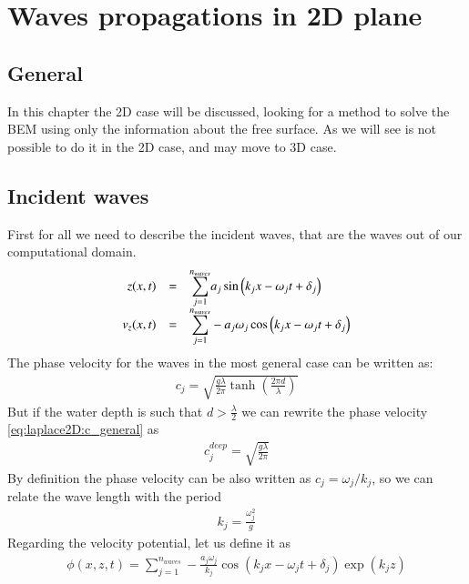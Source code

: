 \chapter{Waves propagations in 2D plane}
\label{s:laplace2D}
%
\section{General}
%
In this chapter the 2D case will be discussed, looking for
a method to solve the BEM using only the information about
the free surface. As we will see is not possible to do it in
the 2D case, and may move to 3D case.
%
\section{Incident waves}
%
First for all we need to describe the incident waves, that are
the waves out of our computational domain.
%
\begin{eqnarray}
	\label{eq:laplace2D:incident_waves}
	\begin{array}{rcl}
	z(x,t) & = & \dsty{\sum_{j=1}^{n_{waves}}} a_j \sin\left(k_j x - \omega_j t + \delta_j \right)
	\\
	v_z(x,t) & = & \dsty{\sum_{j=1}^{n_{waves}}} - a_j \omega_j \cos\left(k_j x - \omega_j t + \delta_j \right)
	\end{array}
\end{eqnarray}
%
The phase velocity for the waves in the most general case can
be written as:
%
\begin{eqnarray}
	\label{eq:laplace2D:c_general}
	c_j = \sqrt{\frac{g \lambda}{2 \pi} \tanh\left(\frac{2 \pi d}{\lambda}\right)}
\end{eqnarray}
%
But if the water depth is such that $d > \frac{\lambda}{2}$ we
can rewrite the phase velocity \ref{eq:laplace2D:c_general} as
%
\begin{eqnarray}
	\label{eq:laplace2D:c_deep}
	c_j^{deep} = \sqrt{\frac{g \lambda}{2 \pi}}
\end{eqnarray}
%
By definition the phase velocity can be also written as
$c_j = \omega_j / k_j$, so we can relate the wave length
with the period
%
\begin{eqnarray}
	\label{eq:laplace2D:k_w}
	k_j = \frac{\omega_j^2}{g}
\end{eqnarray}
%
Regarding the velocity potential, let us define it as
%
\begin{eqnarray}
	\label{eq:laplace2D:incident_waves_potential}
	\phi(x,z,t) = \sum_{j=1}^{n_{waves}} - \frac{a_j \omega_j}{k_j}
	                  \cos\left(k_j x - \omega_j t + \delta_j \right)
	                  \exp\left(k_j z\right)
\end{eqnarray}

